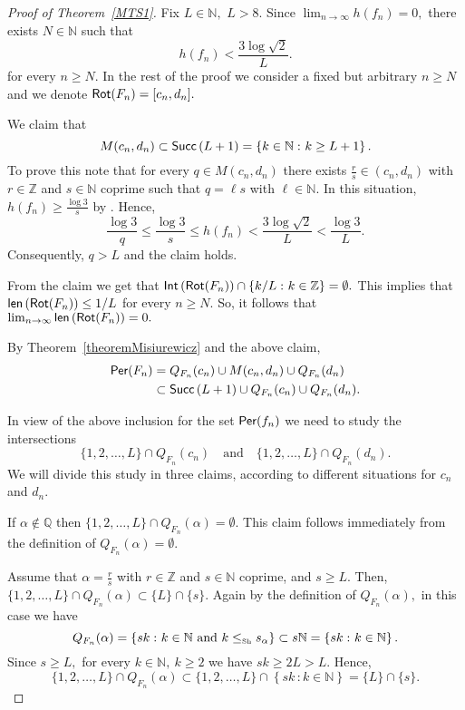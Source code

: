 \documentclass[a4paper, 11pt]{amsart}
\numberwithin{equation}{section}
\theoremstyle{customnumberedtheorem}
\theoremstyle{definitionwithbfnote}
\def\leso#1{\mathrel{\le_{#1}}}
\def\Sho{\mbox{\tiny\textup{Sh}}}
\newenvironment{autocase}[2][Case]{\case{#1 #2.}}{\endcase}
\newcommand{\N}{\ensuremath{\mathbb{N}}}
\newcommand{\Z}{\ensuremath{\mathbb{Z}}}
\newcommand{\Q}{\ensuremath{\mathbb{Q}}}
\DeclareMathOperator{\len}{\textsf{\upshape len}}
\DeclareMathOperator{\Per}{\textsf{\upshape Per}}
\DeclareMathOperator{\Rot}{\textsf{\upshape Rot}}
\DeclareMathOperator{\Int}{\textsf{\upshape Int}}
\DeclareMathOperator{\Succ}{\textsf{\upshape Succ}}
\newcommand{\succs}[1]{\ensuremath{\Succ\left(#1\right)}}
\newcommand{\set}[2]{\ensuremath{\left\{#1 \,\colon #2\right\}}}
\newcommand{\andq}[1][and]{\ensuremath{\quad\text{#1}\quad}}
\begin{document}
\begin{proof}[Proof of Theorem~\ref{MTS1}]
Fix $L\in \N,$ $L > 8.$
Since $\lim_{n\to\infty} h(f_n) = 0,$
there exists $N\in \N$ such that
\[
   h(f_n) < \frac{3\log \sqrt{2}}{L}.
\]
for every $n \ge N.$
In the rest of the proof we consider a fixed but arbitrary $n \ge N$
and we denote $\Rot(F_n) = [c_n, d_n].$

We claim that
\begin{equation}\label{LaPartM}
  M(c_n,d_n) \subset \succs{L+1} = \set{k\in \N}{k \ge L+1}.
\end{equation}
To prove this note that for every $q \in M(c_n,d_n)$
there exists  $\tfrac{r}{s} \in (c_n,d_n)$ with $r\in\Z$ and $s\in \N$
coprime such that $q = \ell s$ with $\ell \in \N.$
In this situation,
$h(f_n) \ge \tfrac{\log 3}{s}$ by \cite[Corollary~4.7.7]{alm}.
Hence,
\[
 \frac{\log 3}{q} \le \frac{\log 3}{s} \le h(f_n) <
           \frac{3\log \sqrt{2}}{L} < \frac{\log 3}{L}.
\]
Consequently, $q > L$ and the claim holds.

From the claim we get that
$
\Int\left(\Rot(F_n)\right) \cap \set{k/L}{k \in \Z} = \emptyset.
$
This implies that
$\len\left(\Rot(F_n)\right) \le 1/L$ for every $n \ge N.$
So, it follows that $\lim_{n\to\infty} \len\left(\Rot(F_n)\right) = 0.$

By Theorem~\ref{theoremMisiurewicz} and the above claim,
\begin{equation}\label{SetOfperiods}
\begin{split}
 \Per(F_n) & = Q_{F_n}(c_n) \cup M(c_n,d_n) \cup Q_{F_n}(d_n)\\
           & \subset \succs{L+1} \cup Q_{F_n}(c_n) \cup Q_{F_n}(d_n).
\end{split}
\end{equation}

In view of the above inclusion for the set $\Per(f_n)$ we need to study
the intersections
\[
  \{1,2,\dots,L\} \cap Q_{F_n}(c_n)
  \andq
  \{1,2,\dots,L\} \cap Q_{F_n}(d_n).
\]
We will divide this study in three claims, according to
different situations for $c_n$ and $d_n.$

\begin{autocase}[Claim]{1} If $\alpha \notin \Q$ then  $\{1,2,\dots,L\} \cap Q_{F_n}(\alpha) = \emptyset.$\end{autocase}
This claim follows immediately from the definition of $Q_{F_n}(\alpha) = \emptyset.$

\begin{autocase}[Claim]{2}
Assume that $\alpha = \tfrac{r}{s}$ with $r\in\Z$ and $s\in \N$ coprime, and $s \ge L.$
Then, $\{1,2,\dots,L\} \cap Q_{F_n}(\alpha) \subset \{L\} \cap \{s\}.$
\end{autocase}
Again by the definition of $Q_{F_n}(\alpha),$ in this case we have
\[
  Q_{F_n}(\alpha) = \set{s k}{k\in\N \text{ and } k \leso{\Sho} s_{\alpha}} \subset s\N = \set{s k}{k\in\N}.
\]
Since $s \ge L,$ for every $k\in\N,\ k \ge 2$ we have
$
 sk \ge 2L > L.
$
Hence,
\[
  \{1,2,\dots,L\} \cap Q_{F_n}(\alpha) \subset \{1,2,\dots,L\} \cap \set{s k}{k\in\N} = \{L\} \cap \{s\}.
\]


\end{proof}
\end{document}
